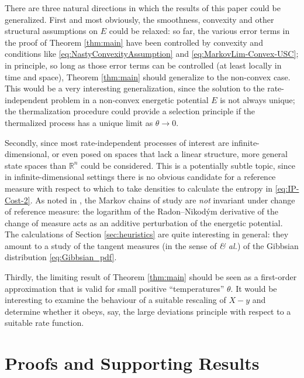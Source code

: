 \documentclass[reqno]{amsart}
\theoremstyle{definition}
\begin{document}
There are three natural directions in which the results of this paper could be generalized.  First and most obviously, the smoothness, convexity and other structural assumptions on $E$ could be relaxed:  so far, the various error terms in the proof of Theorem \ref{thm:main} have been controlled by convexity and conditions like \eqref{eq:NastyConvexityAssumption} and \eqref{eq:MarkovLim-Convex-USC};  in principle, so long as those error terms can be controlled (at least locally in time and space), Theorem \ref{thm:main} should generalize to the non-convex case.  This would be a very interesting generalization, since the solution to the rate-independent problem in a non-convex energetic potential $E$ is not always unique;  the thermalization procedure could provide a selection principle if the thermalized process has a unique limit as $\theta \to 0$.

Secondly, since most rate-independent processes of interest are infinite-\linebreak[4]dimensional, or even posed on spaces that lack a linear structure, more general state spaces than ${\mathbb{R}}^{n}$ could be considered.  This is a potentially subtle topic, since in infinite-dimensional settings there is no obvious candidate for a reference measure with respect to which to take densities to calculate the entropy in \eqref{eq:IP-Cost-2}.  As noted in \cite[Theorem 5.3.5]{Sullivan:2009}, the Markov chains of study are \emph{not} invariant under change of reference measure:  the logarithm of the Radon--Nikod{\'y}m derivative of the change of measure acts as an additive perturbation of the energetic potential.  The calculations of Section \ref{sec:heuristics} are quite interesting in general:  they amount to a study of the tangent measures (in the sense of \cite{Preiss:1987} \emph{\& al.}) of the Gibbsian distribution \eqref{eq:Gibbsian_pdf}.

Thirdly, the limiting result of Theorem \ref{thm:main} should be seen as a first-order approximation that is valid for small positive ``temperatures'' $\theta$.  It would be interesting to examine the behaviour of a suitable rescaling of $X - y$ and determine whether it obeys, say, the large deviations principle with respect to a suitable rate function.

\section{Proofs and Supporting Results}
\label{sec:proofs}
\end{document}
